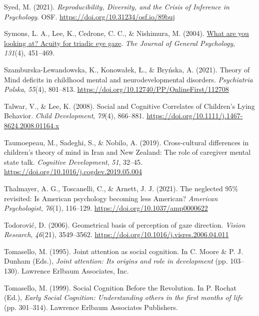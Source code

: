 \documentclass[
]{scrbook}
\newlength{\cslhangindent}
\newenvironment{CSLReferences}[2] %
 {\begin{list}{}{%
  \setlength{\itemindent}{0pt}
  \setlength{\leftmargin}{0pt}
  \setlength{\parsep}{0pt}
  \ifodd #1
   \setlength{\leftmargin}{\cslhangindent}
   \setlength{\itemindent}{-1\cslhangindent}
  \fi
  \setlength{\itemsep}{#2\baselineskip}}}
 {\end{list}}
\begin{document}
\begin{CSLReferences}{1}{0}
Syed, M. (2021). \emph{Reproducibility, {Diversity}, and the {Crisis} of {Inference} in {Psychology}}. OSF. \url{https://doi.org/10.31234/osf.io/89buj}

Symons, L. A., Lee, K., Cedrone, C. C., \& Nishimura, M. (2004). \href{https://www.ncbi.nlm.nih.gov/pmc/articles/PMC2564292}{What are you looking at? {Acuity} for triadic eye gaze}. \emph{The Journal of General Psychology}, \emph{131}(4), 451--469.

Szamburska-Lewandowska, K., Konowałek, Ł., \& Bryńska, A. (2021). Theory of {Mind} deficits in childhood mental and neurodevelopmental disorders. \emph{Psychiatria Polska}, \emph{55}(4), 801--813. \url{https://doi.org/10.12740/PP/OnlineFirst/112708}

Talwar, V., \& Lee, K. (2008). Social and {Cognitive Correlates} of {Children}'s {Lying Behavior}. \emph{Child Development}, \emph{79}(4), 866--881. \url{https://doi.org/10.1111/j.1467-8624.2008.01164.x}

Taumoepeau, M., Sadeghi, S., \& Nobilo, A. (2019). Cross-cultural differences in children's theory of mind in {Iran} and {New Zealand}: {The} role of caregiver mental state talk. \emph{Cognitive Development}, \emph{51}, 32--45. \url{https://doi.org/10.1016/j.cogdev.2019.05.004}

Thalmayer, A. G., Toscanelli, C., \& Arnett, J. J. (2021). The neglected 95\% revisited: {Is American} psychology becoming less {American}? \emph{American Psychologist}, \emph{76}(1), 116--129. \url{https://doi.org/10.1037/amp0000622}

Todorović, D. (2006). Geometrical basis of perception of gaze direction. \emph{Vision Research}, \emph{46}(21), 3549--3562. \url{https://doi.org/10.1016/j.visres.2006.04.011}

Tomasello, M. (1995). Joint attention as social cognition. In C. Moore \& P. J. Dunham (Eds.), \emph{Joint attention: {Its} origins and role in development} (pp. 103--130). Lawrence Erlbaum Associates, Inc.

Tomasello, M. (1999). Social {Cognition Before} the {Revolution}. In P. Rochat (Ed.), \emph{Early {Social Cognition}: {Understanding} others in the first months of life} (pp. 301--314). Lawrence Erlbaum Associates Publishers.


\end{CSLReferences}
\end{document}
